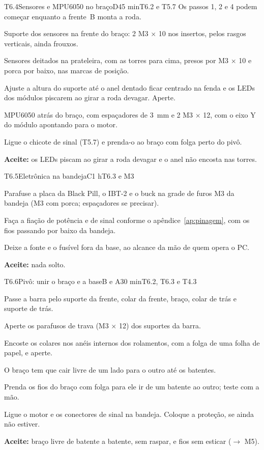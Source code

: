 \documentclass[11pt,a4paper]{article}
\newcommand{\flecha}{\ensuremath{\rightarrow}}
\begin{document}
\begin{tarefa}{T6.4}{Sensores e MPU6050 no braço}{D}{45 min}{T6.2 e T5.7}
Os passos 1, 2 e 4 podem começar enquanto a frente~B monta a roda.
\begin{passos}
  \item Suporte dos sensores na frente do braço: 2 M3 $\times$ 10 nos insertos, pelos rasgos
    verticais, ainda frouxos.
  \item Sensores deitados na prateleira, com as torres para cima, presos por M3 $\times$ 10
    e porca por baixo, nas marcas de posição.
  \item Ajuste a altura do suporte até o anel dentado ficar centrado na fenda e os LEDs dos
    módulos piscarem ao girar a roda devagar. Aperte.
  \item MPU6050 atrás do braço, com espaçadores de 3~mm e 2 M3 $\times$ 12, com o eixo Y do
    módulo apontando para o motor.
  \item Ligue o chicote de sinal (T5.7) e prenda-o ao braço com folga perto do pivô.
\end{passos}
\textbf{Aceite:} os LEDs piscam ao girar a roda devagar e o anel não encosta nas torres.
\end{tarefa}

\begin{tarefa}{T6.5}{Eletrônica na bandeja}{C}{1 h}{T6.3 e M3}
\begin{passos}
  \item Parafuse a placa da Black Pill, o IBT-2 e o buck na grade de furos M3 da bandeja
    (M3 com porca; espaçadores se precisar).
  \item Faça a fiação de potência e de sinal conforme o apêndice~\ref{ap:pinagem}, com os
    fios passando por baixo da bandeja.
  \item Deixe a fonte e o fusível fora da base, ao alcance da mão de quem opera o PC.
\end{passos}
\textbf{Aceite:} nada solto.
\end{tarefa}

\begin{tarefa}[critica]{T6.6}{Pivô: unir o braço e a base}{B e A}{30 min}{T6.2, T6.3 e T4.3}
\begin{passos}
  \item Passe a barra pelo suporte da frente, colar da frente, braço, colar de trás e suporte
    de trás.
  \item Aperte os parafusos de trava (M3 $\times$ 12) dos suportes da barra.
  \item Encoste os colares nos anéis internos dos rolamentos, com a folga de uma folha de
    papel, e aperte.
  \item O braço tem que cair livre de um lado para o outro até os batentes.
  \item Prenda os fios do braço com folga para ele ir de um batente ao outro; teste com a
    mão.
  \item Ligue o motor e os conectores de sinal na bandeja. Coloque a proteção, se ainda não
    estiver.
\end{passos}
\textbf{Aceite:} braço livre de batente a batente, sem raspar, e fios sem esticar
(\flecha{} M5).
\end{tarefa}
\end{document}
